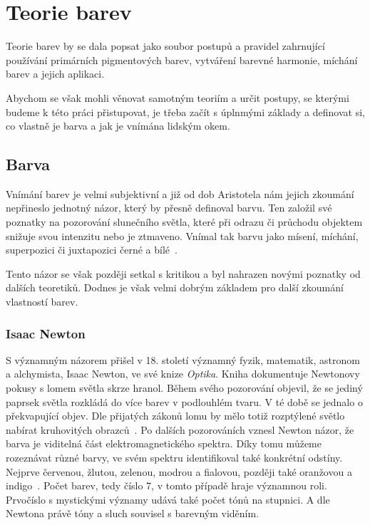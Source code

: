 \section{Teorie barev}
Teorie barev by se dala popsat jako soubor postupů a pravidel zahrnující 
používání primárních pigmentových barev, vytváření barevné harmonie, míchání barev
a jejich aplikaci.

Abychom se však mohli věnovat samotným teoriím a určit postupy, se kterými budeme k této práci
přistupovat, je třeba začít s úplnmými základy a definovat si, co vlastně je barva a jak je vnímána
lidským okem.


\subsection{Barva}
Vnímání barev je velmi subjektivní a již od dob Aristotela nám jejich zkoumání nepřineslo
jednotný názor, který by přesně definoval barvu.
Ten založil své poznatky na pozorování slunečního světla, které při odrazu či průchodu objektem
snižuje svou intenzitu nebo je ztmaveno. Vnímal tak barvu jako mísení, míchání, superpozici či juxtapozici
černé a bílé~\cite{goethe1840}.

Tento názor se však později setkal s kritikou a byl nahrazen novými poznatky od dalších teoretiků. Dodnes je však
velmi dobrým základem pro další zkoumání vlastností barev.

\subsubsection{Isaac Newton}
S významným názorem přišel v 18. století významný fyzik, matematik, astronom a alchymista, Isaac Newton, ve své knize \emph{Optika}. Kniha dokumentuje Newtonovy pokusy s lomem světla
skrze hranol. Během svého pozorování objevil, že se jediný paprsek světla rozkládá do více barev v podlouhlém tvaru. V té době se jednalo o překvapující
objev. Dle přijatých zákonů lomu by mělo totiž rozptýlené světlo nabírat kruhovitých obrazců~\cite{adams2013newton}. Po dalších pozorováních vznesl Newton názor, že barva je 
viditelná část elektromagnetického spektra. Díky tomu můžeme rozeznávat různé barvy, ve svém spektru
identifikoval také konkrétní odstíny. Nejprve červenou, žlutou, zelenou, modrou a fialovou, později také oranžovou a indigo~\cite{science-color}.
Počet barev, tedy číslo 7, v tomto případě hraje významnou roli. Prvočíslo s mystickými významy udává také počet tónů na stupnici. A dle Newtona
právě tóny a sluch souvisel s barevným viděním. 

